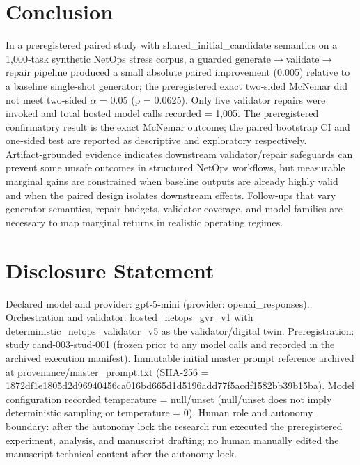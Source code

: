 \documentclass[conference]{IEEEtran}
\begin{document}
\section{Conclusion}
In a preregistered paired study with shared\_initial\_candidate semantics on a 1,000‑task synthetic NetOps stress corpus, a guarded generate\ensuremath{\rightarrow}validate\ensuremath{\rightarrow}repair pipeline produced a small absolute paired improvement (0.005) relative to a baseline single‑shot generator; the preregistered exact two‑sided McNemar did not meet two‑sided \ensuremath{\alpha} = 0.05 (p = 0.0625). Only five validator repairs were invoked and total hosted model calls recorded = 1,005. The preregistered confirmatory result is the exact McNemar outcome; the paired bootstrap CI and one‑sided test are reported as descriptive and exploratory respectively. Artifact‑grounded evidence indicates downstream validator/repair safeguards can prevent some unsafe outcomes in structured NetOps workflows, but measurable marginal gains are constrained when baseline outputs are already highly valid and when the paired design isolates downstream effects. Follow‑ups that vary generator semantics, repair budgets, validator coverage, and model families are necessary to map marginal returns in realistic operating regimes.

\section*{Disclosure Statement}
Declared model and provider: gpt‑5‑mini (provider: openai\_responses). Orchestration and validator: hosted\_netops\_gvr\_v1 with deterministic\_netops\_validator\_v5 as the validator/digital twin. Preregistration: study cand‑003‑stud‑001 (frozen prior to any model calls and recorded in the archived execution manifest). Immutable initial master prompt reference archived at provenance/master\_prompt.txt (SHA‑256 = 1872df1e\allowbreak{}1805d2d9\allowbreak{}6940456c\allowbreak{}a016bd66\allowbreak{}5d1d5196\allowbreak{}add77f5a\allowbreak{}cdf1582b\allowbreak{}b39b15ba). Model configuration recorded temperature = null/unset (null/unset does not imply deterministic sampling or temperature = 0). Human role and autonomy boundary: after the autonomy lock the research run executed the preregistered experiment, analysis, and manuscript drafting; no human manually edited the manuscript technical content after the autonomy lock.
\end{document}
